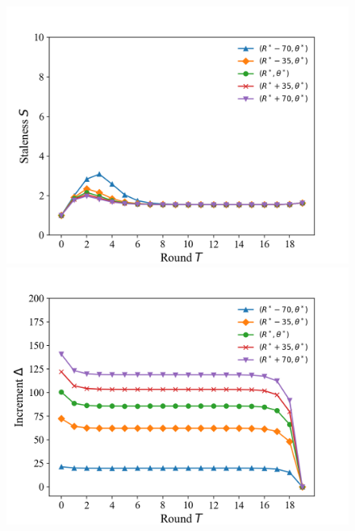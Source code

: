 \documentclass{article}
\theoremstyle{plain}
\theoremstyle{definition}
\theoremstyle{remark}
\begin{document}
\begin{figure}
\begin{minipage}{0.32\linewidth}
		\vspace{3pt}
		\centerline{\includegraphics[width=\textwidth]{figures/figure_55_C.png}}
	\end{minipage}
  \qquad
	\begin{minipage}{0.33\linewidth}
		\vspace{3pt}
		\centerline{\includegraphics[width=\textwidth]{figures/figure_59_A.png}}
	\end{minipage}
	\begin{minipage}{0.33\linewidth}
		\vspace{3pt}

\end{minipage}
\end{figure}
\end{document}
